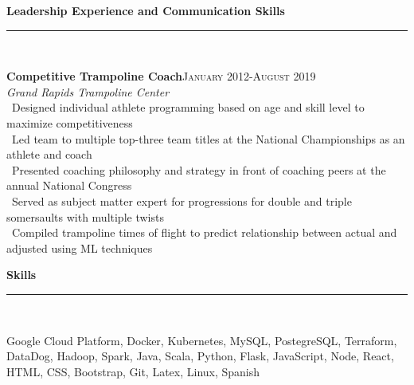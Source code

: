 \documentclass[a4paper,10pt]{article}
\newcommand{\horizontalline}{{\rule{533pt}{0.625pt}\\}}
\renewcommand{\section}[1]{{\noindent\textbf{\large #1}\\\horizontalline}}
\renewcommand{\subsection}[2]{{\noindent \textbf{#1}\hfill \textsc{#2}\\}}
\begin{document}
\section{Leadership Experience and Communication Skills}
\subsection{Competitive Trampoline Coach}{January 2012-August 2019}
\textit{Grand Rapids Trampoline Center}\\
\textbullet\ Designed individual athlete programming based on age and skill level to maximize competitiveness\\
\textbullet\ Led team to multiple top-three team titles at the National Championships as an athlete and coach\\
\textbullet\ Presented coaching philosophy and strategy in front of coaching peers at the annual National Congress\\
\textbullet\ Served as subject matter expert for progressions for double and triple somersaults with multiple twists\\
\textbullet\ Compiled trampoline times of flight to predict relationship between actual and adjusted using ML techniques\\

\section{Skills}
Google Cloud Platform, Docker, Kubernetes, MySQL, PostegreSQL, Terraform, DataDog, Hadoop, Spark, Java, Scala, Python, Flask, JavaScript, Node, React, HTML, CSS, Bootstrap, Git, Latex, Linux, Spanish\\
\end{document}
